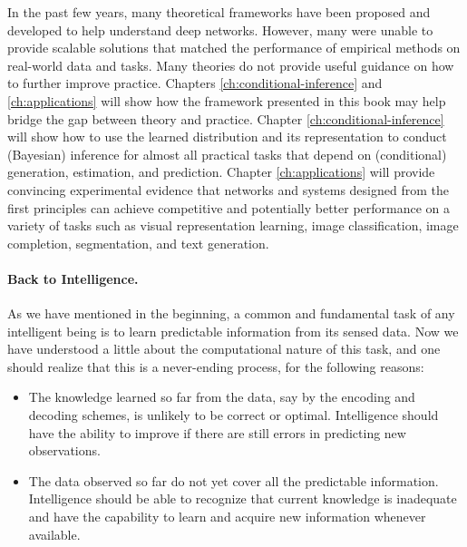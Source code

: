 \documentclass[../../book-main.tex]{subfiles}
\begin{document}
In the past few years, many theoretical frameworks have been proposed and developed to help understand deep networks. However, many were unable to provide scalable solutions that matched the performance of empirical methods on real-world data and tasks. Many theories do not provide useful guidance on how to further improve practice. Chapters \ref{ch:conditional-inference} and  \ref{ch:applications} will show how the framework presented in this book may help bridge the gap between theory and practice. Chapter \ref{ch:conditional-inference} will show how to use the learned distribution and its representation to conduct (Bayesian) inference for almost all practical tasks that depend on (conditional) generation, estimation, and prediction. Chapter \ref{ch:applications} will provide convincing experimental evidence that networks and systems designed from the first principles can achieve competitive and potentially better performance on a variety of tasks such as visual representation learning,  image classification, image completion, segmentation, and text generation.


\paragraph{Back to Intelligence.}
As we have mentioned in the beginning, a common and fundamental task of any intelligent being is to learn predictable information from its sensed data. Now we have understood a little about the computational nature of this task, and one should realize that this is a never-ending process, for the following reasons:
\begin{itemize}
    \item The knowledge learned so far from the data, say by the encoding and decoding schemes, is unlikely to be correct or optimal. Intelligence should have the ability to improve if there are still errors in predicting new observations. 
    \item The data observed so far do not yet cover all the predictable information. Intelligence should be able to recognize that current knowledge is inadequate and have the capability to learn and acquire new information whenever available.
\end{itemize}
\end{document}
